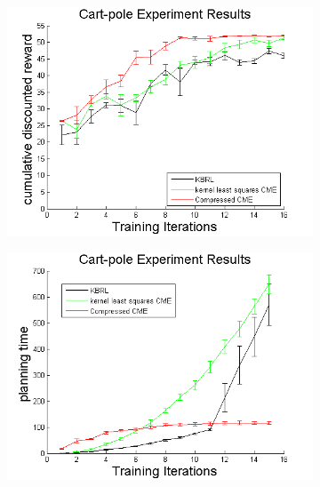 \documentclass[letterpaper]{article}
\begin{document}
\begin{figure}[htb]
\centering
\begin{subfigure}[b]{0.3\textwidth}
\includegraphics[width=\textwidth]{CPrewards.png}
\end{subfigure}
\begin{subfigure}[b]{0.3\textwidth}
\includegraphics[width=\textwidth]{CPplanning.png}
\end{subfigure}
\begin{subfigure}[b]{0.3\textwidth}

\end{subfigure}
\end{figure}
\end{document}
